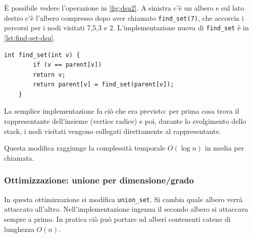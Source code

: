 \documentclass[italian,10pt,a4paper]{article}
\begin{document}
È possibile vedere l'operazione in \cref{fig:dsu2}. A sinistra c'è un albero e sul lato destro c'è l'albero compresso dopo aver chiamato \texttt{find\_set(7)}, che accorcia i percorsi per i nodi visitati 7,5,3 e 2.
L'implementazione nuova di \texttt{find\_set} è in \cref{lst:find-set-dsu}.
\begin{lstlisting}[caption={nuova implementazione di \texttt{find\_set.}},label=lst:find-set-dsu]
	int find_set(int v) {
		if (v == parent[v])
		return v;
		return parent[v] = find_set(parent[v]);
	}
\end{lstlisting}

La semplice implementazione fa ciò che era previsto: per prima cosa trova il rappresentante dell'insieme (vertice radice) e poi, durante lo svolgimento dello stack, i nodi visitati vengono collegati direttamente al rappresentante. \par Questa modifica raggiunge la complessità temporale $O(\log n)$ in media per chiamata. 
\subsubsection{Ottimizzazione: unione per dimensione/grado}
In questa ottimizzazione si modifica \texttt{union\_set}. Si cambia quale albero verrà attaccato all'altro. Nell'implementazione ingenua il secondo albero si attaccava sempre a primo. In pratica ciò può portare ad alberi contenenti catene di lunghezza $O(n)$. 
\end{document}
